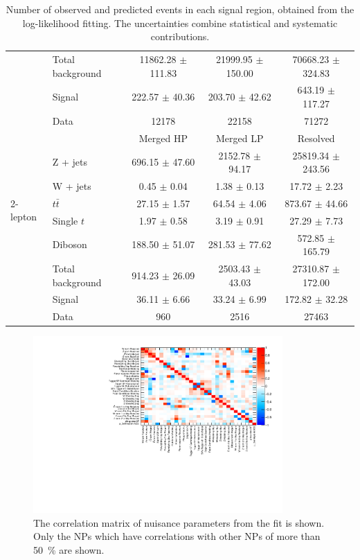 \begin{table}[htbp]
\begin{center}
\begin{tabular}{| l | l | c | c | c |}
                   & Total background    & 11862.28 $\pm$ 111.83            &   21999.95 $\pm$ 150.00         & 70668.23 $\pm$ 324.83\\ \cline{2-5}
                   & Signal       & 222.57 $\pm$ 40.36           & 203.70 $\pm$ 42.62           &643.19 $\pm$ 117.27\\ \cline{2-5}
                   & Data         & 12178           & 22158           &71272\\ \hline \hline
\multirow{7}{*}{2-lepton} &     & Merged HP  & Merged LP               & Resolved  \\ \cline{2-5}
        & Z + jets    &  696.15 $\pm$ 47.60  & 2152.78 $\pm$ 94.17     & 25819.34 $\pm$ 243.56\\ 
        & W + jets    &  0.45 $\pm$ 0.04     & 1.38 $\pm$ 0.13         & 17.72 $\pm$ 2.23\\  
        & $t\bar{t}$  &  27.15 $\pm$ 1.57    & 64.54 $\pm$ 4.06        & 873.67 $\pm$ 44.66\\ 
        & Single $t$        &  1.97 $\pm$ 0.58     & 3.19 $\pm$ 0.91         & 27.29 $\pm$ 7.73\\ 
        & Diboson     &  188.50 $\pm$ 51.07  & 281.53 $\pm$ 77.62      & 572.85 $\pm$ 165.79\\ \cline{2-5}
        & Total background   &  914.23 $\pm$ 26.09  & 2503.43 $\pm$ 43.03  & 27310.87 $\pm$ 172.00\\ \cline{2-5}
        & Signal      &  36.11 $\pm$ 6.66    & 33.24 $\pm$ 6.99        & 172.82 $\pm$ 32.28\\ \cline{2-5}
        & Data        &  960                 & 2516                    & 27463\\ \hline 
\end{tabular}
\caption{\label{tab:postyields} Number of observed and predicted events in each signal region, obtained from the log-likelihood fitting. The uncertainties combine statistical and systematic contributions. }
\end{center}
\end{table}
\begin{figure}[]
    \centering
    \includegraphics[width=0.85\textwidth]{figures/fitresults/corr_HighCorrNoMCStat.pdf}
    \caption{The correlation matrix of nuisance parameters from the fit is shown. Only the NPs which have correlations with other NPs of more than 50~\% are shown.}
    \label{fig:correlation}
\end{figure}

